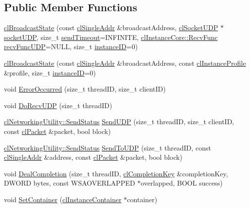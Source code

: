 \subsection*{Public Member Functions}
\begin{DoxyCompactItemize}
\item 
\hyperlink{classcl_broadcast_state_ae636f0e8b364fb0b24eba7c03aa307de}{clBroadcastState} (const \hyperlink{classcl_single_addr}{clSingleAddr} \&broadcastAddress, \hyperlink{classcl_socket_u_d_p}{clSocketUDP} $\ast$\hyperlink{classcl_instance_u_d_p_adabf31cb357eb5dada6ad5c8e57c611e}{socketUDP}, size\_\-t \hyperlink{classcl_instance_core_a05be31d3ac12930f23fb1a06c25b225c}{sendTimeout}=INFINITE, \hyperlink{classcl_instance_core_afa96c2a2c0b26b6a9256b87798bf9587}{clInstanceCore::RecvFunc} \hyperlink{classcl_instance_u_d_p_a71fd288aaec92fa83f45060bc15d1f1e}{recvFuncUDP}=NULL, size\_\-t \hyperlink{classcl_instance_core_ad3de74dbad74098dc2f010806186bf7f}{instanceID}=0)
\item 
\hyperlink{classcl_broadcast_state_a4368da68216919a50063224a5f6566b6}{clBroadcastState} (const \hyperlink{classcl_single_addr}{clSingleAddr} \&broadcastAddress, const \hyperlink{classcl_instance_profile}{clInstanceProfile} \&profile, size\_\-t \hyperlink{classcl_instance_core_ad3de74dbad74098dc2f010806186bf7f}{instanceID}=0)
\item 
void \hyperlink{classcl_broadcast_state_a4f5e91ef70339629c71fbaa1f87b2f39}{ErrorOccurred} (size\_\-t threadID, size\_\-t clientID)
\item 
void \hyperlink{classcl_broadcast_state_a4878d6ca8f78741539f7d7d8ce3c47b8}{DoRecvUDP} (size\_\-t threadID)
\item 
\hyperlink{classcl_networking_utility_a19389cda12603396e03caa9d82073803}{clNetworkingUtility::SendStatus} \hyperlink{classcl_broadcast_state_ac86581b6b63cc9a587e663abeb2dcbfe}{SendUDP} (size\_\-t threadID, size\_\-t clientID, const \hyperlink{classcl_packet}{clPacket} \&packet, bool block)
\item 
\hyperlink{classcl_networking_utility_a19389cda12603396e03caa9d82073803}{clNetworkingUtility::SendStatus} \hyperlink{classcl_broadcast_state_ad57cd2f1b520b292de409e5bf064d92b}{SendToUDP} (size\_\-t threadID, const \hyperlink{classcl_single_addr}{clSingleAddr} \&address, const \hyperlink{classcl_packet}{clPacket} \&packet, bool block)
\item 
void \hyperlink{classcl_broadcast_state_ac63a0685d30154d928d37d3f09561ac8}{DealCompletion} (size\_\-t threadID, \hyperlink{classcl_completion_key}{clCompletionKey} \&completionKey, DWORD bytes, const WSAOVERLAPPED $\ast$overlapped, BOOL success)
\item 
void \hyperlink{classcl_broadcast_state_a0daeea87a7c2ffbcb062f254db68041a}{SetContainer} (\hyperlink{classcl_instance_container}{clInstanceContainer} $\ast$container)
\end{DoxyCompactItemize}

